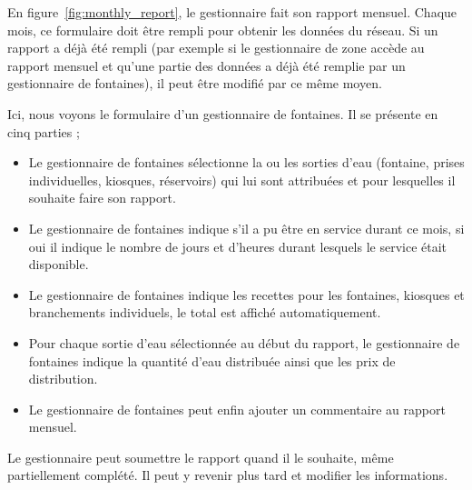 \documentclass[a4paper, 11pt]{article}
\begin{document}
    En figure~\ref{fig:monthly_report}, le gestionnaire fait son rapport mensuel. Chaque mois, ce formulaire doit être rempli pour obtenir les données du réseau. Si un rapport a déjà été rempli (par exemple si le gestionnaire de zone accède au rapport mensuel et qu'une partie des données a déjà été remplie par un gestionnaire de fontaines), il peut être modifié par ce même moyen.

    Ici, nous voyons le formulaire d'un gestionnaire de fontaines. Il se présente en cinq parties ;
    \begin{itemize}
      \item Le gestionnaire de fontaines sélectionne la ou les sorties d'eau (fontaine, prises individuelles, kiosques, réservoirs) qui lui sont attribuées et pour lesquelles il souhaite faire son rapport.
      \item Le gestionnaire de fontaines indique s'il a pu être en service durant ce mois, si oui il indique le nombre de jours et d'heures durant lesquels le service était disponible.
      \item Le gestionnaire de fontaines indique les recettes pour les fontaines, kiosques et branchements individuels, le total est affiché automatiquement.
      \item Pour chaque sortie d'eau sélectionnée au début du rapport, le gestionnaire de fontaines indique la quantité d'eau distribuée ainsi que les prix de distribution.
      \item Le gestionnaire de fontaines peut enfin ajouter un commentaire au rapport mensuel.
    \end{itemize}

    Le gestionnaire peut soumettre le rapport quand il le souhaite, même partiellement complété. Il peut y revenir plus tard et modifier les informations.
\end{document}
